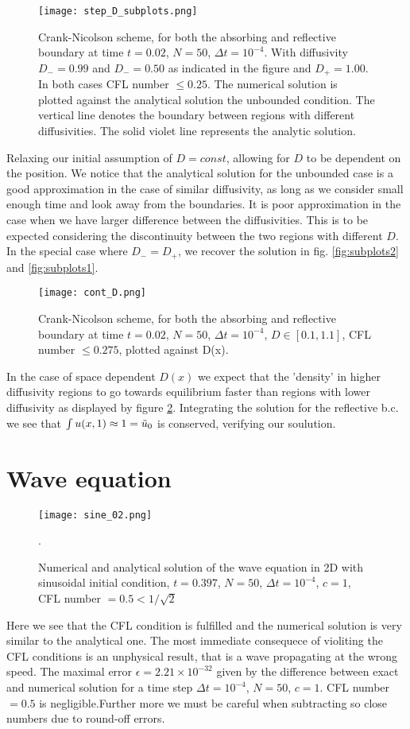 \documentclass[5p,sort&compress]{elsarticle}
\numberwithin{equation}{subsection}
\begin{document}
\begin{figure}[H]
\centering
\texttt{[image: step\_D\_subplots.png]} %
\caption{Crank-Nicolson scheme, for both the absorbing and reflective boundary at time $t=0.02$, $N = 50$, $\Delta t = 10^{-4}$. With diffusivity $D_- = 0.99$ and $D_- = 0.50$ as indicated in the figure and $D_+ = 1.00$. In both cases CFL number $\leq 0.25$. The numerical solution is plotted against the analytical solution the unbounded condition. The vertical line denotes the boundary between regions with different diffusivities. The solid violet line represents the analytic solution.}
\label{fig:step_D_subplots}
\end{figure}
Relaxing our initial assumption of $D = const$, allowing for $D$ to be dependent on the position. We notice that the analytical solution for the unbounded
case is a good approximation in the case of similar diffusivity,
as long as we consider small enough time and look away
from the boundaries. It is poor approximation
in the case when we have larger difference between the
diffusivities. This is to be expected considering the discontinuity between the two regions with different $D$. In the special case where $D_- = D_+$, we recover the solution in fig. \ref{fig:subplots2} and \ref{fig:subplots1}.
\begin{figure}[H]
\centering
\texttt{[image: cont\_D.png]} %
\caption{Crank-Nicolson scheme, for both the absorbing and reflective boundary at time $t=0.02$, $N = 50$, $\Delta t = 10^{-4}$, $D \in [0.1,1.1] $, CFL number $\leq 0.275$, plotted against D(x).}
\label{fig:cont_D}
\end{figure}
In the case of space dependent $D(x)$ we expect that the 'density' in higher diffusivity regions to go towards equilibrium faster than regions with lower diffusivity as displayed by figure \ref{fig:cont_D}. Integrating the solution for the reflective b.c. we see that $\int u(x,1) \approx 1 = \Tilde{u}_0$ is conserved, verifying our soulution. 

\section{Wave equation}
\begin{figure}[H]
\centering
\texttt{[image: sine\_02.png]} %
\caption{Numerical and analytical solution of the wave equation in 2D with sinusoidal initial condition,  $t=0.397$, $N = 50$, $\Delta t = 10^{-4}$, $c = 1 $, CFL number $ = 0.5 < 1/\sqrt{2}$}.
\label{fig:sine_02}
\end{figure}
Here we see that the CFL condition is fulfilled and the
numerical solution is very similar to the analytical one. The
most immediate consequece of violiting the CFL conditions
is an unphysical result, that is a wave propagating at the
wrong speed. The maximal error $\epsilon = 2.21\times10^{-32}$ given by the difference between exact and numerical solution for a time step $\Delta t =10^{-4}$, $N = 50$, $c = 1$. CFL number $=0.5$ is negligible.Further more we must be careful when subtracting so close numbers due to round-off errors.
\end{document}
